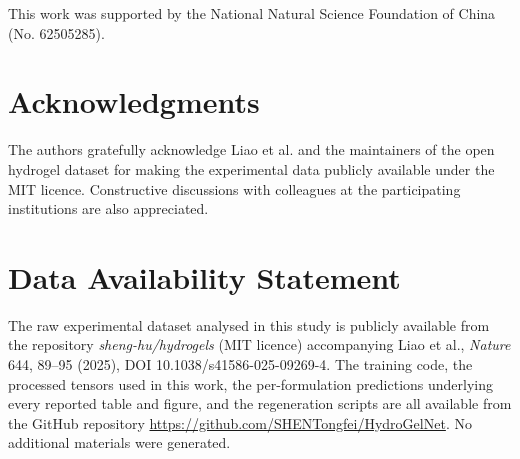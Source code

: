 \documentclass[utf8]{FrontiersinHarvard}
\begin{document}
This work was supported by the National Natural Science Foundation of China (No. 62505285).

\section*{Acknowledgments}

The authors gratefully acknowledge Liao et al. and the maintainers of the open hydrogel dataset for making the experimental data publicly available under the MIT licence. Constructive discussions with colleagues at the participating institutions are also appreciated.

\section*{Data Availability Statement}

The raw experimental dataset analysed in this study is publicly available from the repository \emph{sheng-hu/hydrogels} (MIT licence) accompanying Liao et al., \textit{Nature} 644, 89--95 (2025), DOI 10.1038/s41586-025-09269-4. The training code, the processed tensors used in this work, the per-formulation predictions underlying every reported table and figure, and the regeneration scripts are all available from the GitHub repository \url{https://github.com/SHENTongfei/HydroGelNet}. No additional materials were generated.



\end{document}

